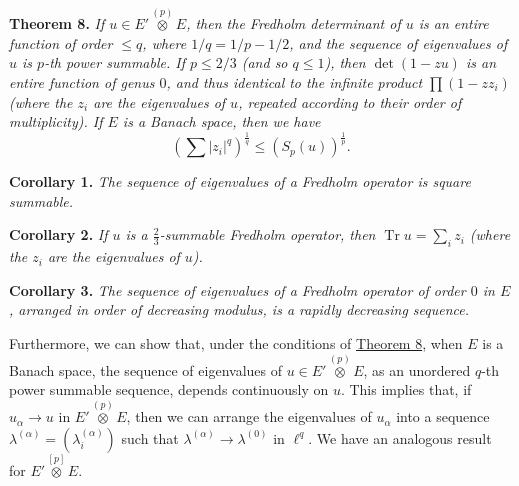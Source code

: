 \documentclass[british]{article}
\newenvironment{itenv}[1]
  {\phantomsection\par\smallskip\noindent\textbf{#1.}\itshape}
  {\par\smallskip}
\newcommand{\oldpage}[1]{\marginpar{\footnotesize$\Big\vert$ \textit{p.~#1}}}
\begin{document}
\oldpage{108}

\protect{}\label{section-2-theorem-8}
\begin{itenv}{Theorem 8}
If \(u\in E'\overset{(p)}{\otimes}E\), then the Fredholm determinant of
\(u\) is an entire function of order \(\leqslant q\), where
\(1/q=1/p-1/2\), and the sequence of eigenvalues of \(u\) is \(p\)-th
power summable. If \(p\leqslant 2/3\) (and so \(q\leqslant 1\)), then
\(\det(1-zu)\) is an entire function \emph{of genus \(0\)}, and thus
identical to the infinite product \(\prod(1-zz_i)\) (where the \(z_i\)
are the eigenvalues of \(u\), repeated according to their order of
multiplicity). If \(E\) is a Banach space, then we have \[
  \left(\sum|z_i|^q\right)^{\frac1q} \leqslant(S_p(u))^{\frac1p}.
\]

\end{itenv}

\protect{}\label{section-2-theorem-8-corollary-1}
\begin{itenv}{Corollary 1}
The sequence of eigenvalues of a Fredholm operator is square summable.

\end{itenv}

\protect{}\label{section-2-theorem-8-corollary-2}
\begin{itenv}{Corollary 2}
If \(u\) is a \(\frac23\)-summable Fredholm operator, then
\(\operatorname{Tr}u=\sum_i z_i\) (where the \(z_i\) are the eigenvalues
of \(u\)).

\end{itenv}

\protect{}\label{section-2-theorem-8-corollary-3}
\begin{itenv}{Corollary 3}
The sequence of eigenvalues of a Fredholm operator of order \(0\) in
\(E\), arranged in order of decreasing modulus, is a rapidly decreasing
sequence.

\end{itenv}

Furthermore, we can show that, under the conditions of
\hyperref[section-2-theorem-8]{Theorem 8}, when \(E\) is a Banach space,
the sequence of eigenvalues of \(u\in E'\overset{(p)}{\otimes}E\), as an
unordered \(q\)-th power summable sequence, depends continuously on
\(u\). This implies that, if \(u_\alpha\to u\) in
\(E'\overset{(p)}{\otimes}E\), then we can arrange the eigenvalues of
\(u_\alpha\) into a sequence
\(\lambda^{(\alpha)}=(\lambda_i^{(\alpha)})\) such that
\(\lambda^{(\alpha)}\to\lambda^{(0)}\) in \(\ell^q\). We have an
analogous result for \(E'\overset{[p]}{\otimes}E\).
\end{document}
